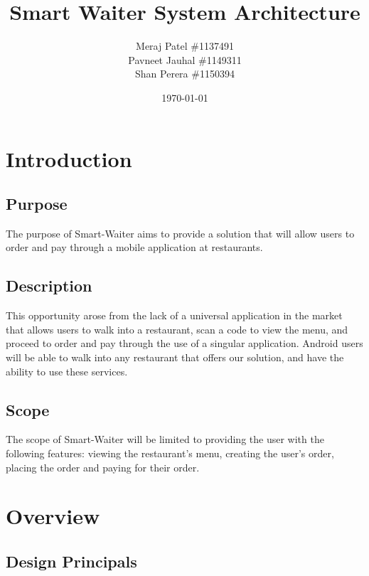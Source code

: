 \documentclass[12pt, titlepage]{article}
\begin{document}
\title{Smart Waiter System Architecture} 
\author{Meraj Patel \#1137491 \\ Pavneet Jauhal \#1149311\\ Shan Perera \#1150394}
\date{\today}
\maketitle

\tableofcontents 

\listoffigures

\listoftables

\section{Introduction}

\subsection{Purpose}
The purpose of Smart-Waiter aims to provide a solution that will allow users to order and pay through a mobile application at restaurants.

\subsection{Description}
This opportunity arose from the lack of a universal application in the market that allows users to walk into a restaurant, scan a code to view the menu, and proceed to order and pay through the use of a singular application. Android users will be able to walk into any restaurant that offers our solution, and have the ability to use these services.

\subsection{Scope}
The scope of Smart-Waiter will be limited to providing the user with the following features: viewing the restaurant's menu, creating the user's order, placing the order and paying for their order. 

\section{Overview}

\subsection{Design Principals}
\end{document}
